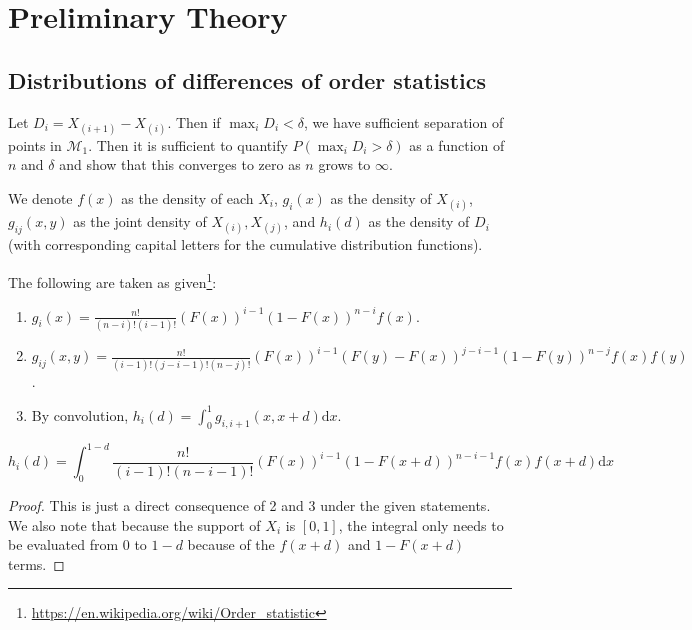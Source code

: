 \documentclass[
  11pt,
]{article}
\providecommand{\tightlist}{%
  \setlength{\itemsep}{0pt}\setlength{\parskip}{0pt}}
\begin{document}
\hypertarget{preliminary-theory}{%
\section{Preliminary Theory}\label{preliminary-theory}}

\hypertarget{distributions-of-differences-of-order-statistics}{%
\subsection{Distributions of differences of order
statistics}\label{distributions-of-differences-of-order-statistics}}

Let \(D_i = X_{(i+1)} - X_{(i)}\). Then if \(\max_i D_i < \delta\), we
have sufficient separation of points in \(\mathcal{M}_1\). Then it is
sufficient to quantify \(P(\max_i D_i > \delta)\) as a function of \(n\)
and \(\delta\) and show that this converges to zero as \(n\) grows to
\(\infty\).

We denote \(f(x)\) as the density of each \(X_i\), \(g_i(x)\) as the
density of \(X_{(i)}\), \(g_{ij}(x, y)\) as the joint density of
\(X_{(i)}, X_{(j)}\), and \(h_i(d)\) as the density of \(D_i\) (with
corresponding capital letters for the cumulative distribution
functions).

The following are taken as given\footnote{\url{https://en.wikipedia.org/wiki/Order_statistic}}:

\begin{enumerate}
\def\labelenumi{\arabic{enumi}.}
\tightlist
\item
  \(g_i(x) = \frac{n!}{(n-i)! (i-1)!} (F(x))^{i-1} (1 - F(x))^{n-i} f(x)\).
\item
  \(g_{ij}(x, y) = \frac{n!}{(i-1)! (j-i-1)! (n-j)!} (F(x))^{i-1} (F(y) - F(x))^{j-i-1} (1 - F(y))^{n-j} f(x) f(y)\).
\item
  By convolution,
  \(h_i(d) = \int_0^{1} g_{i, i+1} (x, x + d) \mathrm{d}x\).
\end{enumerate}

\begin{lemma}
\begin{equation}
\label{eq:pdf}
h_i(d) = \int_0^{1-d} \frac{n!}{(i-1)! (n-i-1)!} (F(x))^{i-1} (1 - F(x+d))^{n-i-1} f(x) f(x+d) \mathrm{d}x 
\end{equation}
\end{lemma}

\begin{proof}
This is just a direct consequence of 2 and 3 under the given statements. 
We also note that because the support of $X_i$ is $[0, 1]$, 
the integral only needs to be evaluated from $0$ to $1 - d$ 
because of the $f(x+d)$ and $1 - F(x+d)$ terms.
\end{proof}
\end{document}

